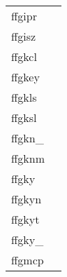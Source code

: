 \documentclass[11pt]{book}
\begin{document}
\begin{tabular}{lr}
ffgipr & \pageref{ffgipr} \\
ffgisz & \pageref{ffgisz} \\
ffgkcl      & \pageref{ffgkcl} \\
ffgkey      & \pageref{ffgkey} \\
ffgkls  & \pageref{ffgkls} \\
ffgksl  & \pageref{ffgksl} \\
ffgkn\_     & \pageref{ffgknx} \\
ffgknm    & \pageref{ffgknm} \\
ffgky          & \pageref{ffgky} \\
ffgkyn         & \pageref{ffgkyn} \\
ffgkyt   & \pageref{ffgkyt} \\
ffgky\_      & \pageref{ffgkyx} \\
ffgmcp   & \pageref{ffgmcp} \\

\end{tabular}
\end{document}
